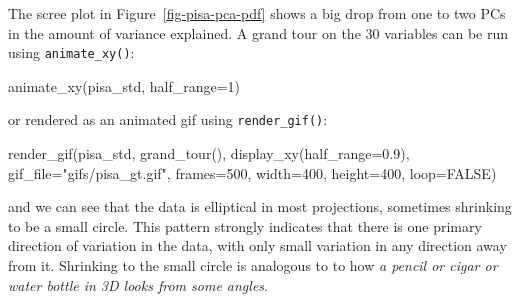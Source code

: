 \documentclass[
  letterpaper,
]{krantz}
\newenvironment{Shaded}{\begin{snugshade}}{\end{snugshade}}
\newcommand{\AttributeTok}[1]{\textcolor[rgb]{0.40,0.45,0.13}{#1}}
\newcommand{\ConstantTok}[1]{\textcolor[rgb]{0.56,0.35,0.01}{#1}}
\newcommand{\DecValTok}[1]{\textcolor[rgb]{0.68,0.00,0.00}{#1}}
\newcommand{\FloatTok}[1]{\textcolor[rgb]{0.68,0.00,0.00}{#1}}
\newcommand{\FunctionTok}[1]{\textcolor[rgb]{0.28,0.35,0.67}{#1}}
\newcommand{\NormalTok}[1]{\textcolor[rgb]{0.00,0.23,0.31}{#1}}
\newcommand{\StringTok}[1]{\textcolor[rgb]{0.13,0.47,0.30}{#1}}
\begin{document}
The scree plot in Figure~\ref{fig-pisa-pca-pdf} shows a big drop from
one to two PCs in the amount of variance explained. A grand tour on the
30 variables can be run using \texttt{animate\_xy()}:

\begin{Shaded}
\begin{Highlighting}[]
\FunctionTok{animate\_xy}\NormalTok{(pisa\_std, }\AttributeTok{half\_range=}\DecValTok{1}\NormalTok{)}
\end{Highlighting}
\end{Shaded}

or rendered as an animated gif using \texttt{render\_gif()}:

\begin{Shaded}
\begin{Highlighting}[]
\FunctionTok{render\_gif}\NormalTok{(pisa\_std, }
           \FunctionTok{grand\_tour}\NormalTok{(), }
           \FunctionTok{display\_xy}\NormalTok{(}\AttributeTok{half\_range=}\FloatTok{0.9}\NormalTok{),}
           \AttributeTok{gif\_file=}\StringTok{"gifs/pisa\_gt.gif"}\NormalTok{,}
           \AttributeTok{frames=}\DecValTok{500}\NormalTok{,}
           \AttributeTok{width=}\DecValTok{400}\NormalTok{,}
           \AttributeTok{height=}\DecValTok{400}\NormalTok{,}
           \AttributeTok{loop=}\ConstantTok{FALSE}\NormalTok{)}
\end{Highlighting}
\end{Shaded}

and we can see that the data is elliptical in most projections,
sometimes shrinking to be a small circle. This pattern strongly
indicates that there is one primary direction of variation in the data,
with only small variation in any direction away from it. Shrinking to
the small circle is analogous to to how \emph{a pencil or cigar or water
bottle in 3D looks from some angles}.
\end{document}

